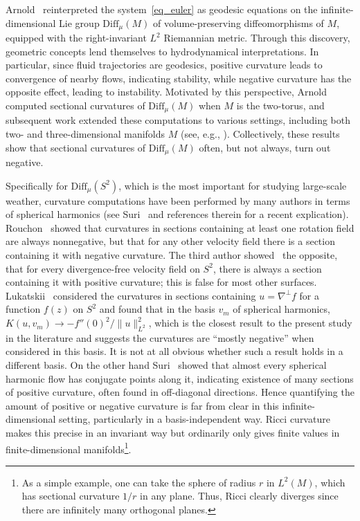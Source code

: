 \documentclass[11pt]{amsart}
\numberwithin{equation}{section}
\theoremstyle{definition}
\begin{document}
Arnold~\cite{arnold2013differential} reinterpreted the system~\eqref{eq_euler} as geodesic equations on the infinite-dimensional Lie group $\mathrm{Diff}_{\mu}(M)$ of volume-preserving diffeomorphisms of $M$, equipped with the right-invariant $L^2$ Riemannian metric. 
Through this discovery, geometric concepts lend themselves to hydrodynamical interpretations.
In particular, since fluid trajectories are geodesics, positive curvature leads to convergence of nearby flows, indicating stability, while negative curvature has the opposite effect, leading to instability. 
Motivated by this perspective, Arnold computed sectional curvatures of $\mathrm{Diff}_{\mu}(M)$ when $M$ is the two-torus, and subsequent work extended these computations to various settings, including both two- and three-dimensional manifolds $M$ (see, e.g.,  \cite{lukatskii1984curvature,rouchon1992thejacobi,misiolek1993stability,preston2005nonpositive,smolentsev2006diffeomorphism}). Collectively, these results show that sectional curvatures of $\mathrm{Diff}_{\mu}(M)$ often, but not always, turn out negative.

Specifically for $\mathrm{Diff}_{\mu}(S^2)$, which is the most important for studying large-scale weather, curvature computations have been performed by many authors in terms of spherical harmonics (see Suri~\cite{Suri} and references therein for a recent explication). Rouchon~\cite{rouchon1992thejacobi} showed that curvatures in sections containing at least one rotation field are always nonnegative, but that for any other velocity field there is a section containing it with negative curvature. The third author showed~\cite{preston2005nonpositive} the opposite, that for every divergence-free velocity field on $S^2$, there is always a section containing it with positive curvature; this is false for most other surfaces. Lukatskii~\cite{lukatskii1988thestructure} considered the curvatures in sections containing $u=\nabla^{\perp}f$ for a function $f(z)$ on $S^2$ and found that in the basis $v_m$ of spherical harmonics, $K(u, v_m) \to -f''(0)^2/\lVert u\rVert^2_{L^2}$, which is the closest result to the present study in the literature and suggests the curvatures are ``mostly negative'' when considered in this basis. It is not at all obvious whether such a result holds in a different basis. On the other hand Suri~\cite{suri2024conjugate} showed that almost every spherical harmonic flow has conjugate points along it, indicating existence of many sections of positive curvature, often found in off-diagonal directions. Hence quantifying the amount of positive or negative curvature is far from clear in this infinite-dimensional setting, particularly in a basis-independent way. Ricci curvature makes this precise in an invariant way but ordinarily only gives finite values in finite-dimensional manifolds\footnote{As a simple example, one can take the sphere of radius $r$ in $L^2(M)$, which has sectional curvature $1/r$ in any plane. Thus, Ricci clearly diverges since there are infinitely many orthogonal planes.}.
\end{document}
